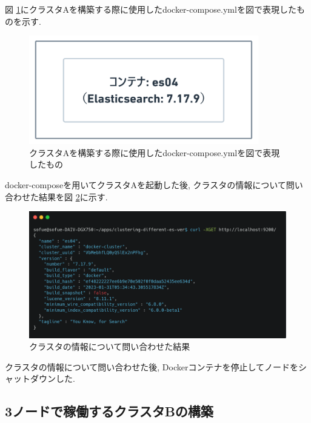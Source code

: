 図 \ref{4-p8}にクラスタAを構築する際に使用したdocker-compose.ymlを図で表現したものを示す.

\begin{figure}[H]
  \begin{center}
    \includegraphics[width=100mm]{sotu/figure/1-7.17.9.png}
    \caption{クラスタAを構築する際に使用したdocker-compose.ymlを図で表現したもの}
    \label{4-p8}
  \end{center}
\end{figure}

docker-composeを用いてクラスタAを起動した後, クラスタの情報について問い合わせた結果を図 \ref{4-p9}に示す.

\begin{figure}[H]
  \begin{center}
    \includegraphics[width=140mm]{sotu/figure/es04-cluster.png}
    \caption{クラスタの情報について問い合わせた結果}
    \label{4-p9}
  \end{center}
\end{figure}

クラスタの情報について問い合わせた後, Dockerコンテナを停止してノードをシャットダウンした.

\subsection{3ノードで稼働するクラスタBの構築}

